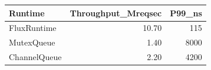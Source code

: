 \begin{tabular}{lrr}
\toprule
Runtime & Throughput_Mreqsec & P99_ns \\
\midrule
FluxRuntime & 10.70 & 115 \\
MutexQueue & 1.40 & 8000 \\
ChannelQueue & 2.20 & 4200 \\
\bottomrule
\end{tabular}

